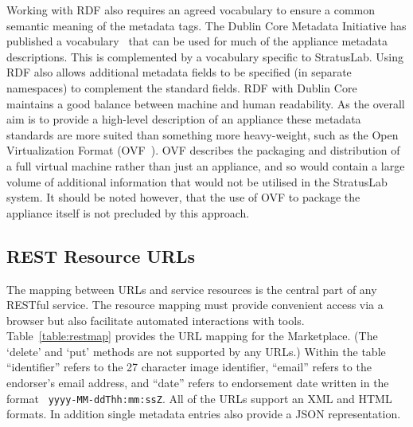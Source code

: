 Working with RDF also requires an agreed vocabulary to ensure a common
semantic meaning of the metadata tags.  The Dublin Core Metadata
Initiative has published a vocabulary~\cite{dcterms} that can be used
for much of the appliance metadata descriptions.  This is complemented
by a vocabulary specific to StratusLab\@.  Using RDF also allows
additional metadata fields to be specified (in separate namespaces) to
complement the standard fields. RDF with Dublin Core maintains a good
balance between machine and human readability. As the overall aim is
to provide a high-level description of an appliance these metadata
standards are more suited than something more heavy-weight, such as
the Open Virtualization Format (OVF~\cite{ovf}). OVF describes the
packaging and distribution of a full virtual machine rather than just
an appliance, and so would contain a large volume of additional
information that would not be utilised in the StratusLab system. It
should be noted however, that the use of OVF to package the appliance
itself is not precluded by this approach.

\subsection{REST Resource URLs}

The mapping between URLs and service resources is the central part of
any RESTful service.  The resource mapping must provide convenient
access via a browser but also facilitate automated interactions with
tools.  Table~\ref{table:restmap} provides the URL mapping for the
Marketplace.  (The `delete' and `put' methods are not supported by any
URLs.)  Within the table ``identifier'' refers to the 27 character
image identifier, ``email'' refers to the endorser's email address,
and ``date'' refers to endorsement date written in the format {\tt
  yyyy-MM-ddThh:mm:ssZ}.  All of the URLs support an
XML and HTML formats.  In addition single metadata entries also 
provide a JSON representation.

